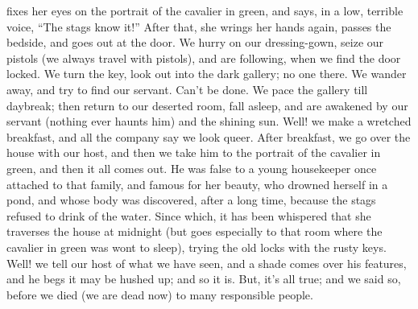 fixes her eyes on the portrait of the cavalier in green, and says,
in a low, terrible voice, ``The stags know it!''  After that, she
wrings her hands again, passes the bedside, and goes out at the
door.  We hurry on our dressing-gown, seize our pistols (we always
travel with pistols), and are following, when we find the door
locked.  We turn the key, look out into the dark gallery; no one
there.  We wander away, and try to find our servant.  Can't be done.
We pace the gallery till daybreak; then return to our deserted room,
fall asleep, and are awakened by our servant (nothing ever haunts
him) and the shining sun.  Well! we make a wretched breakfast, and
all the company say we look queer.  After breakfast, we go over the
house with our host, and then we take him to the portrait of the
cavalier in green, and then it all comes out.  He was false to a
young housekeeper once attached to that family, and famous for her
beauty, who drowned herself in a pond, and whose body was
discovered, after a long time, because the stags refused to drink of
the water.  Since which, it has been whispered that she traverses
the house at midnight (but goes especially to that room where the
cavalier in green was wont to sleep), trying the old locks with the
rusty keys.  Well! we tell our host of what we have seen, and a
shade comes over his features, and he begs it may be hushed up; and
so it is.  But, it's all true; and we said so, before we died (we
are dead now) to many responsible people.

